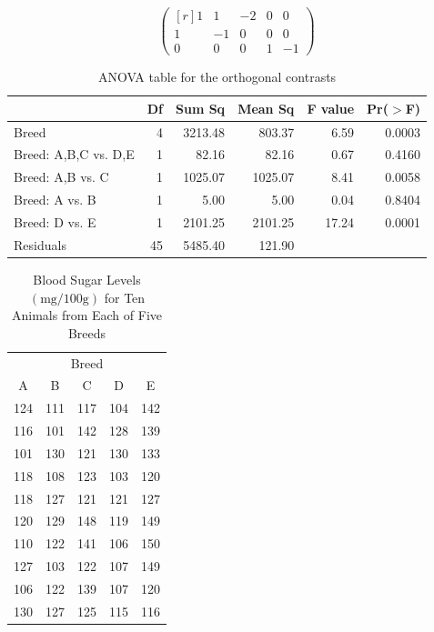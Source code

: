 \documentclass[12pt]{article} %
\begin{document}
\begin{enumerate}
\begin{itemize}
\begin{itemize}
$$\begin{pmatrix}[r]
			    1 &   1 &  -2  &   0 &   0 \\
			    1 &  -1 &   0  &   0 &   0 \\
			    0 &   0 &   0  &   1 &  -1
			\end{pmatrix}		    
		    $$		   
\begin{table}[ht]
\begin{center}
\begin{tabular}{lrrrrr}
  \hline
 & Df & Sum Sq & Mean Sq & F value & Pr($>$F) \\ 
  \hline
Breed                  & 4 & 3213.48 & 803.37 & 6.59 & 0.0003 \\ 
    Breed: A,B,C vs. D,E & 1 & 82.16 & 82.16 & 0.67 & 0.4160 \\ 
    Breed: A,B vs. C     & 1 & 1025.07 & 1025.07 & 8.41 & 0.0058 \\ 
    Breed: A vs. B       & 1 & 5.00 & 5.00 & 0.04 & 0.8404 \\ 
    Breed: D vs. E       & 1 & 2101.25 & 2101.25 & 17.24 & 0.0001 \\ 
  Residuals              & 45 & 5485.40 & 121.90 &  &  \\ 
   \hline
\end{tabular}
\caption{ANOVA table for the orthogonal contrasts}
\end{center}
\end{table}   		  \end{itemize}	    
		\begin{table}[ht]
		\begin{center}
		\begin{tabular}{ccccc}
		  \hline
		  \multicolumn{5}{c}{Breed}\\
		  A & B & C & D & E\\ 
		  \hline
		  124 & 111 & 117 & 104 & 142 \\ 
		  116 & 101 & 142 & 128 & 139 \\
		  101 & 130 & 121 & 130 & 133 \\
		  118 & 108 & 123 & 103 & 120 \\
		  118 & 127 & 121 & 121 & 127 \\
		  120 & 129 & 148 & 119 & 149 \\
		  110 & 122 & 141 & 106 & 150 \\
		  127 & 103 & 122 & 107 & 149 \\
		  106 & 122 & 139 & 107 & 120 \\
		  130 & 127 & 125 & 115 & 116 \\
		  \hline
		\end{tabular}
		\caption{Blood Sugar Levels $(\mathrm{mg}/100\mathrm{g})$ for Ten Animals from Each of Five Breeds\label{bloodtbl}}
		\end{center}
		\end{table}
	 \end{itemize}
	 

\end{enumerate}
\end{document}
